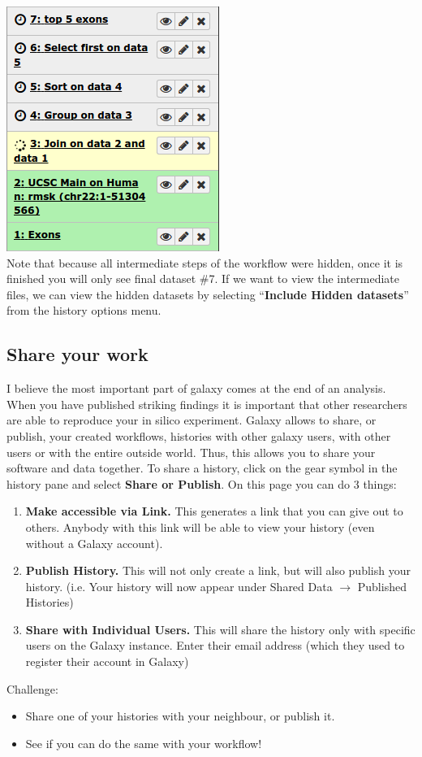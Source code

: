\documentclass[11pt,a4paper]{article}
\begin{document}
\includegraphics[scale=0.55]{figures/101_39}\\
Note that because all intermediate steps of the workflow were hidden, once it is finished you will only see final dataset \#7. If we want to view the intermediate files, we can view the hidden datasets by selecting ``\textbf{Include Hidden datasets}'' from the history options menu.
\subsection{Share your work}
I believe the most important part of galaxy comes at the end of an analysis. When you have published striking findings it is important that other researchers are able to reproduce your in silico experiment. Galaxy allows to share, or publish, your created workflows, histories with other galaxy users, with other users or with the entire outside world. Thus, this allows you to share your software and data together. To share a history, click on the gear symbol in the history pane and select \textbf{Share or Publish}. On this page you can do 3 things:
\begin{enumerate}
	\item \textbf{Make accessible via Link.} This generates a link that you can give out to others. Anybody with this link will be able to view your history (even without a Galaxy account).
	\item \textbf{Publish History.} This will not only create a link, but will also publish your history. (i.e. Your history will now appear
 under Shared Data $\rightarrow$ Published Histories)
	\item \textbf{Share with Individual Users.} This will share the history only with specific users on the Galaxy instance. Enter their email address (which they used to register their account in Galaxy)
\end{enumerate}

Challenge:
\begin{itemize}
	\item Share one of your histories with your neighbour, or publish it.
	\item See if you can do the same with your workflow!
\end{itemize}

%
%


\vspace{-1.5em}

\end{document}
